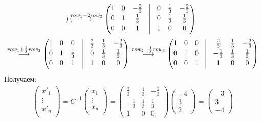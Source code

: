 \documentclass[a4paper,11pt]{article}
\begin{document}
\begin{gather*}
\begin{pmatrix}
\end{pmatrix}
\stackrel{ row_{1} - 2row_{2} }{\longrightarrow}
\begin{pmatrix}
1 & 0 & -\frac{2}{3} & \vrule & 0 & \frac{1}{3} & -\frac{2}{3} \\[2pt]
0 & 1 & \frac{1}{3} & \vrule & 0 & \frac{1}{3} & \frac{1}{3} \\[2pt]
0 & 0 & 1 & \vrule & 1 & 0 & 0 \\[2pt]
\end{pmatrix}
\\[3pt]
\stackrel{ row_{1} + \frac{2}{3}row_{3} }{\longrightarrow}
\begin{pmatrix}
1 & 0 & 0 & \vrule & \frac{2}{3} & \frac{1}{3} & -\frac{2}{3} \\[2pt]
0 & 1 & \frac{1}{3} & \vrule & 0 & \frac{1}{3} & \frac{1}{3} \\[2pt]
0 & 0 & 1 & \vrule & 1 & 0 & 0 \\[2pt]
\end{pmatrix}
\stackrel{ row_{2} - \frac{1}{3}row_{3} }{\longrightarrow}
\begin{pmatrix}
1 & 0 & 0 & \vrule & \frac{2}{3} & \frac{1}{3} & -\frac{2}{3} \\[2pt]
0 & 1 & 0 & \vrule & -\frac{1}{3} & \frac{1}{3} & \frac{1}{3} \\[2pt]
0 & 0 & 1 & \vrule & 1 & 0 & 0 \\[2pt]
\end{pmatrix}
\end{gather*}
Получаем:
\begin{gather*}
 \begin{pmatrix}
x'_1 \\
\vdots \\
x'_n \\
\end{pmatrix}
= C^{-1}
\begin{pmatrix}
x_1 \\
\vdots \\
x_n \\
\end{pmatrix}
= 
\begin{pmatrix}
\frac{2}{3} & \frac{1}{3} & -\frac{2}{3} \\[2pt]
-\frac{1}{3} & \frac{1}{3} & \frac{1}{3} \\[2pt]
1 & 0 & 0
\end{pmatrix}
\begin{pmatrix}
-4 \\[2pt] 3 \\[2pt] 2
\end{pmatrix}
= 
\begin{pmatrix}
-3 \\[2pt] 3 \\[2pt] -4
\end{pmatrix}
\end{gather*}
\newpage
\end{document}
